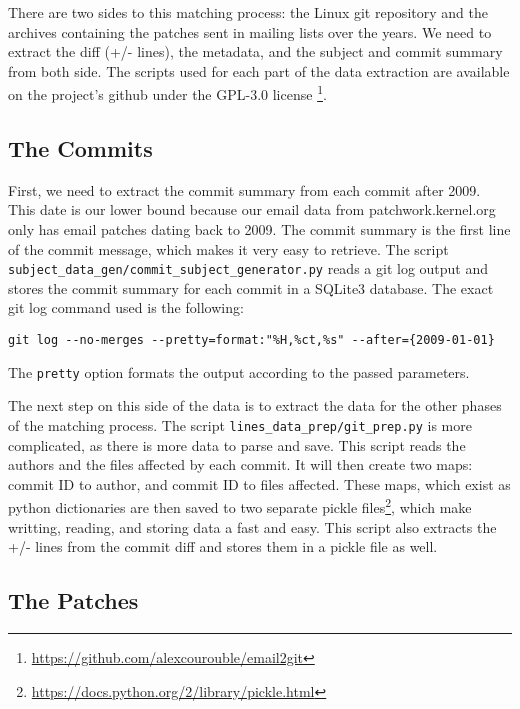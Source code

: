 There are two sides to this matching process: the Linux git repository and the archives containing the patches sent in mailing lists over the years. We need to extract the diff (+/- lines), the metadata, and the subject and commit summary from both side. The scripts used for each part of the data extraction are available on the project's github under the GPL-3.0 license \footnote{\url{https://github.com/alexcourouble/email2git}}.



\subsection{The Commits}

First, we need to extract the commit summary from each commit after 2009. This date is our lower bound because our email data from patchwork.kernel.org only has email patches dating back to 2009. The commit summary is the first line of the commit message, which makes it very easy to retrieve. The script \texttt{subject\_data\_gen/commit\_subject\_generator.py} reads a git log output and stores the commit summary for each commit in a SQLite3 database. The exact git log command used is the following:
\begin{lstlisting}
git log --no-merges --pretty=format:"%H,%ct,%s" --after={2009-01-01}
\end{lstlisting}
The \texttt{pretty} option formats the output according to the passed parameters. 

The next step on this side of the data is to extract the data for the other phases of the matching process. The script \texttt{lines\_data\_prep/git\_prep.py} is more complicated, as there is more data to parse and save. This script reads the authors and the files affected by each commit. It will then create two maps: commit ID to author, and commit ID to files affected. These maps, which exist as python dictionaries are then saved to two separate pickle files\footnote{\url{https://docs.python.org/2/library/pickle.html}}, which make writting, reading, and storing data a fast and easy. This script also extracts the +/- lines from the commit diff and stores them in a pickle file as well. 



\subsection{The Patches}

